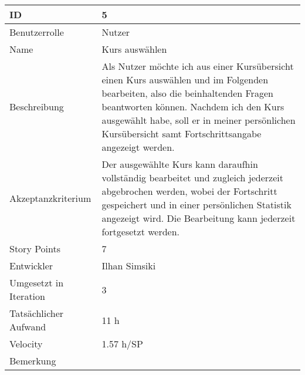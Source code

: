 \begin{tabularx}{\textwidth}{|p{}|X|}
	\hline
	ID & 5\\
	\hline
	Benutzerrolle & Nutzer\\
	\hline
	Name & Kurs auswählen\\
	\hline
	Beschreibung & Als Nutzer möchte ich aus einer Kursübersicht einen Kurs auswählen und im Folgenden bearbeiten, also die beinhaltenden Fragen beantworten können. Nachdem ich den Kurs ausgewählt habe, soll er in meiner persönlichen Kursübersicht samt Fortschrittsangabe angezeigt werden.\\
	\hline
	Akzeptanzkriterium & Der ausgewählte Kurs kann daraufhin vollständig bearbeitet und zugleich jederzeit abgebrochen werden, wobei der Fortschritt gespeichert und in einer persönlichen Statistik angezeigt wird. Die Bearbeitung kann jederzeit fortgesetzt werden.\\
	\hline
	Story Points & 7\\
	\hline
	Entwickler & Ilhan Simsiki\\
	\hline
	Umgesetzt in Iteration & 3\\
	\hline
	Tatsächlicher Aufwand & 11 h\\
	\hline
	Velocity & 1.57 h/SP\\
	\hline
	Bemerkung & \\
	\hline
\end{tabularx}
\vspace{20pt}
